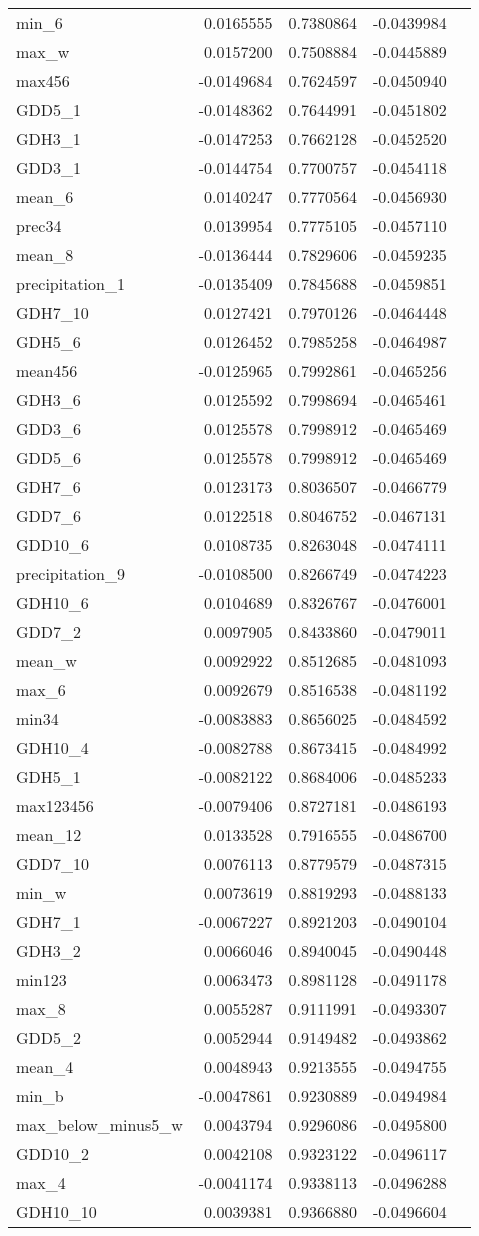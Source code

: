 \documentclass[]{article}
\begin{document}
\begin{longtable}[]{@{}lrrrl@{}}
min\_6 & 0.0165555 & 0.7380864 & -0.0439984 &\tabularnewline
max\_w & 0.0157200 & 0.7508884 & -0.0445889 &\tabularnewline
max456 & -0.0149684 & 0.7624597 & -0.0450940 &\tabularnewline
GDD5\_1 & -0.0148362 & 0.7644991 & -0.0451802 &\tabularnewline
GDH3\_1 & -0.0147253 & 0.7662128 & -0.0452520 &\tabularnewline
GDD3\_1 & -0.0144754 & 0.7700757 & -0.0454118 &\tabularnewline
mean\_6 & 0.0140247 & 0.7770564 & -0.0456930 &\tabularnewline
prec34 & 0.0139954 & 0.7775105 & -0.0457110 &\tabularnewline
mean\_8 & -0.0136444 & 0.7829606 & -0.0459235 &\tabularnewline
precipitation\_1 & -0.0135409 & 0.7845688 & -0.0459851 &\tabularnewline
GDH7\_10 & 0.0127421 & 0.7970126 & -0.0464448 &\tabularnewline
GDH5\_6 & 0.0126452 & 0.7985258 & -0.0464987 &\tabularnewline
mean456 & -0.0125965 & 0.7992861 & -0.0465256 &\tabularnewline
GDH3\_6 & 0.0125592 & 0.7998694 & -0.0465461 &\tabularnewline
GDD3\_6 & 0.0125578 & 0.7998912 & -0.0465469 &\tabularnewline
GDD5\_6 & 0.0125578 & 0.7998912 & -0.0465469 &\tabularnewline
GDH7\_6 & 0.0123173 & 0.8036507 & -0.0466779 &\tabularnewline
GDD7\_6 & 0.0122518 & 0.8046752 & -0.0467131 &\tabularnewline
GDD10\_6 & 0.0108735 & 0.8263048 & -0.0474111 &\tabularnewline
precipitation\_9 & -0.0108500 & 0.8266749 & -0.0474223 &\tabularnewline
GDH10\_6 & 0.0104689 & 0.8326767 & -0.0476001 &\tabularnewline
GDD7\_2 & 0.0097905 & 0.8433860 & -0.0479011 &\tabularnewline
mean\_w & 0.0092922 & 0.8512685 & -0.0481093 &\tabularnewline
max\_6 & 0.0092679 & 0.8516538 & -0.0481192 &\tabularnewline
min34 & -0.0083883 & 0.8656025 & -0.0484592 &\tabularnewline
GDH10\_4 & -0.0082788 & 0.8673415 & -0.0484992 &\tabularnewline
GDH5\_1 & -0.0082122 & 0.8684006 & -0.0485233 &\tabularnewline
max123456 & -0.0079406 & 0.8727181 & -0.0486193 &\tabularnewline
mean\_12 & 0.0133528 & 0.7916555 & -0.0486700 &\tabularnewline
GDD7\_10 & 0.0076113 & 0.8779579 & -0.0487315 &\tabularnewline
min\_w & 0.0073619 & 0.8819293 & -0.0488133 &\tabularnewline
GDH7\_1 & -0.0067227 & 0.8921203 & -0.0490104 &\tabularnewline
GDH3\_2 & 0.0066046 & 0.8940045 & -0.0490448 &\tabularnewline
min123 & 0.0063473 & 0.8981128 & -0.0491178 &\tabularnewline
max\_8 & 0.0055287 & 0.9111991 & -0.0493307 &\tabularnewline
GDD5\_2 & 0.0052944 & 0.9149482 & -0.0493862 &\tabularnewline
mean\_4 & 0.0048943 & 0.9213555 & -0.0494755 &\tabularnewline
min\_b & -0.0047861 & 0.9230889 & -0.0494984 &\tabularnewline
max\_below\_minus5\_w & 0.0043794 & 0.9296086 & -0.0495800
&\tabularnewline
GDD10\_2 & 0.0042108 & 0.9323122 & -0.0496117 &\tabularnewline
max\_4 & -0.0041174 & 0.9338113 & -0.0496288 &\tabularnewline
GDH10\_10 & 0.0039381 & 0.9366880 & -0.0496604 &\tabularnewline

\end{longtable}
\end{document}
